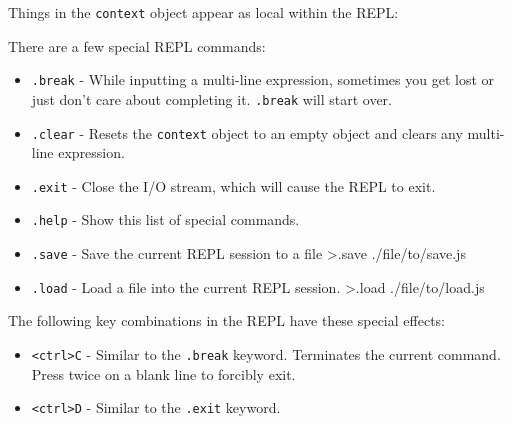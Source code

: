 Things in the \texttt{context} object appear as local within the REPL:

\begin{Shaded}
\begin{Highlighting}[]
\end{Highlighting}
\end{Shaded}

There are a few special REPL commands:

\begin{itemize}
\itemsep1pt\parskip0pt
\item
  \texttt{.break} - While inputting a multi-line expression, sometimes
  you get lost or just don't care about completing it. \texttt{.break}
  will start over.
\item
  \texttt{.clear} - Resets the \texttt{context} object to an empty
  object and clears any multi-line expression.
\item
  \texttt{.exit} - Close the I/O stream, which will cause the REPL to
  exit.
\item
  \texttt{.help} - Show this list of special commands.
\item
  \texttt{.save} - Save the current REPL session to a file
  \textgreater{}.save ./file/to/save.js
\item
  \texttt{.load} - Load a file into the current REPL session.
  \textgreater{}.load ./file/to/load.js
\end{itemize}

The following key combinations in the REPL have these special effects:

\begin{itemize}
\itemsep1pt\parskip0pt
\item
  \texttt{\textless{}ctrl\textgreater{}C} - Similar to the
  \texttt{.break} keyword. Terminates the current command. Press twice
  on a blank line to forcibly exit.
\item
  \texttt{\textless{}ctrl\textgreater{}D} - Similar to the
  \texttt{.exit} keyword.
\end{itemize}
